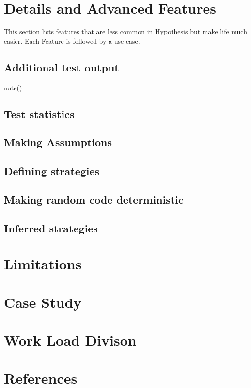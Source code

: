 \documentclass[]{article}
\begin{document}
\section{{\large Details and Advanced Features}}
This section lists features that are less common in Hypothesis but make life much easier.
Each Feature is followed by a use case.
\subsection{Additional test output}
note()
\subsection{Test statistics}
\subsection{Making Assumptions}
\subsection{Defining strategies}
\subsection{Making random code deterministic}
\subsection{Inferred strategies}



\section{{\large Limitations}}

\section{{\large Case Study}}

\section {{\large Work Load Divison}}

\section {{\large References}}
\end{document}
